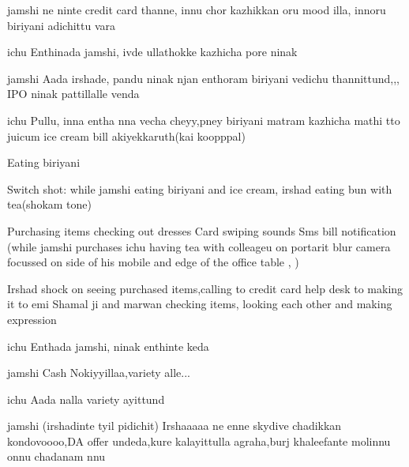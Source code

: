 \documentclass{screenplay}[2012/06/30]
\begin{document}
\begin{dialogue}{jamshi}
ne ninte credit card thanne, innu chor kazhikkan oru mood illa, innoru biriyani adichittu vara
\end{dialogue}

\begin{dialogue}{ichu}
Enthinada jamshi, ivde ullathokke kazhicha pore ninak
\end{dialogue}

\begin{dialogue}{jamshi}
Aada irshade, pandu ninak njan enthoram biriyani vedichu thannittund,,, IPO ninak pattillalle venda 
\end{dialogue}

\begin{dialogue}{ichu}
Pullu, inna entha nna vecha cheyy,pney biriyani matram kazhicha mathi tto juicum ice cream bill akiyekkaruth(kai koopppal)
\end{dialogue}



Eating biriyani

Switch shot: while jamshi eating biriyani and ice cream, irshad eating bun with tea(shokam tone)


Purchasing items
checking out dresses
Card swiping sounds
Sms bill notification (while jamshi purchases ichu having tea with colleageu on portarit blur camera focussed on side of his mobile and edge of the office table , )


Irshad shock on seeing purchased items,calling to credit card help desk to making it to emi
Shamal ji and marwan checking items, looking each other and making expression
\begin{dialogue}{ichu}
Enthada jamshi, ninak enthinte keda
\end{dialogue}

\begin{dialogue}{jamshi}
Cash Nokiyyillaa,variety alle...
\end{dialogue}

\begin{dialogue}{ichu}
Aada nalla variety ayittund
\end{dialogue}

\begin{dialogue}{jamshi}
(irshadinte tyil pidichit)
Irshaaaaa ne enne skydive chadikkan  kondovoooo,DA offer undeda,kure kalayittulla agraha,burj khaleefante molinnu onnu chadanam nnu
\end{dialogue}
\end{document}

